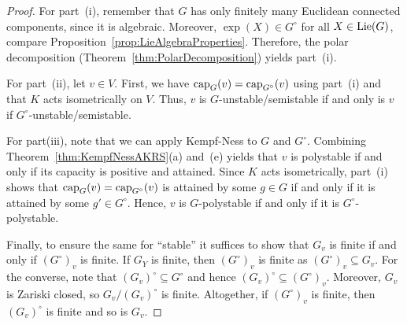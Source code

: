 \begin{proof}
	
	For part~(i), remember that $G$ has only finitely many Euclidean connected components, since it is algebraic. Moreover, $\exp(X) \in G^\circ$ for all $X\in \operatorname{Lie}(G)$, compare Proposition~\ref{prop:LieAlgebraProperties}. Therefore, the polar decomposition (Theorem~\ref{thm:PolarDecomposition}) yields part~(i).
	
	For part~(ii), let $v\in V$. First, we have $\operatorname{cap}_G (v) = \operatorname{cap}_{G^\circ}(v)$ using part~(i) and that $K$ acts isometrically on $V$. Thus, $v$ is $G$-unstable/semistable if and only is $v$ if $G^\circ$-unstable/semistable.
	
	For part(iii), note that we can apply Kempf-Ness to $G$ and $G^\circ$. Combining Theorem~\ref{thm:KempfNessAKRS}(a) and~(e) yields that $v$ is polystable if and only if its capacity is positive and attained. Since $K$ acts isometrically, part~(i) shows that $\operatorname{cap}_G (v) = \operatorname{cap}_{G^\circ}(v)$ is attained by some $g \in G$ if and only if it is attained by some $g' \in G^\circ$. Hence, $v$ is $G$-polystable if and only if it is $G^\circ$-polystable.
	
	Finally, to ensure the same for ``stable'' it suffices to show that $G_v$ is finite if and only if $(G^\circ)_v$ is finite. If $G_Y$ is finite, then $(G^\circ)_v$ is finite as $(G^\circ)_v \subseteq G_v$. For the converse, note that $(G_v)^\circ \subseteq G^\circ$ and hence $(G_v)^\circ \subseteq (G^\circ)_v$. Moreover, $G_v$ is Zariski closed, so $G_v / (G_v)^\circ$ is finite. Altogether, if $(G^\circ)_v$ is finite, then $(G_v)^\circ$ is finite and so is $G_v$.
\end{proof}



